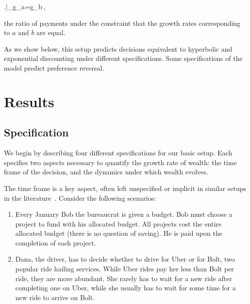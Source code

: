 \be
\delta \equiv \left.\right|_{g_a=g_b}\,,
\ee

\ie the ratio of payments under the constraint that the growth rates corresponding to $a$ and $b$ are equal.

As we show below, this setup predicts decisions equivalent to hyperbolic and exponential discounting under different specifications. Some specifications of the model predict preference reversal.

\section{Results}\label{sec:results}

\subsection{Specification}

We begin by describing four different specifications for our basic setup. Each specifies two aspects necessary to quantify the growth rate of wealth: the time frame of the decision, and the dynamics under which wealth evolves.

The time frame is a key aspect, often left unspecified or implicit in similar setups in the literature~\citep{CohenETAL2019}. Consider the following scenarios:

\begin{enumerate}
\item Every January Bob the bureaucrat is given a budget. Bob must choose a project to fund with his allocated budget. All projects cost the entire allocated budget (there is no question of saving). He is paid upon the completion of each project.
\item Dana, the driver, has to decide whether to drive for Uber or for Bolt, two popular ride hailing services. While Uber rides pay her less than Bolt per ride, they are more abundant. She rarely has to wait for a new ride after completing one on Uber, while she usually has to wait for some time for a new ride to arrive on Bolt.
\end{enumerate}

